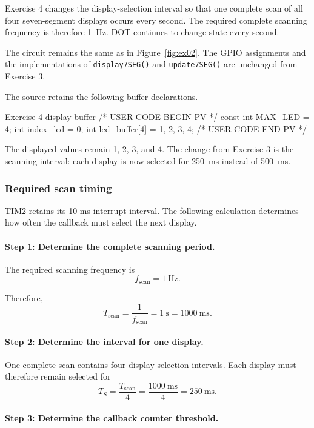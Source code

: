 \documentclass[a4paper]{article}
\begin{document}
Exercise 4 changes the display-selection interval
so that one complete scan of all four seven-segment
displays occurs every second. The required complete
scanning frequency is therefore 1~Hz.
DOT continues to change state every second.

The circuit remains the same as in
Figure~\ref{fig:ex02}. The GPIO assignments and
the implementations of \texttt{display7SEG()}
and \texttt{update7SEG()} are unchanged from
Exercise 3.

The source retains the following buffer declarations.

\begin{stmcode}{Exercise 4 display buffer}
/* USER CODE BEGIN PV */
const int MAX_LED = 4;
int index_led = 0;
int led_buffer[4] = {1, 2, 3, 4};
/* USER CODE END PV */
\end{stmcode}

The displayed values remain 1, 2, 3, and 4.
The change from Exercise 3 is the scanning interval:
each display is now selected for 250~ms instead
of 500~ms.

\subsubsection{Required scan timing}

TIM2 retains its 10-ms interrupt interval.
The following calculation determines how often
the callback must select the next display.

\paragraph{Step 1: Determine the complete scanning period.}

The required scanning frequency is
\[
    f_{\mathrm{scan}} = 1~\mathrm{Hz}.
\]

Therefore,
\[
    T_{\mathrm{scan}}
    = \frac{1}{f_{\mathrm{scan}}}
    = 1~\mathrm{s}
    = 1000~\mathrm{ms}.
\]

\paragraph{Step 2: Determine the interval for one display.}

One complete scan contains four display-selection
intervals. Each display must therefore remain
selected for
\[
    T_S
    = \frac{T_{\mathrm{scan}}}{4}
    = \frac{1000~\mathrm{ms}}{4}
    = 250~\mathrm{ms}.
\]

\paragraph{Step 3: Determine the callback counter threshold.}
\end{document}
